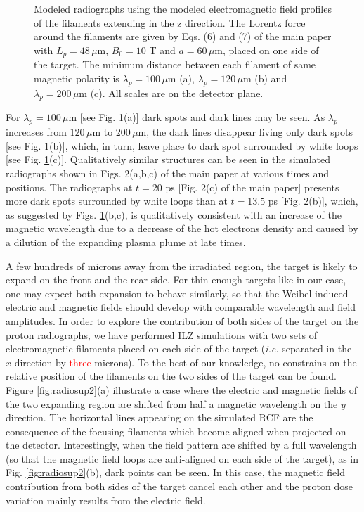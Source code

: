 \documentclass[aps,showpacs,superscriptaddress]{revtex4}
\begin{document}
\begin{figure}[ht]
{\begin{tabular}{ccc}
\end{tabular}}
\caption{\label{fig:radiosup}  
Modeled radiographs using the modeled electromagnetic field profiles of the filaments extending in the z direction.
The Lorentz force around the  filaments  are given by Eqs. (6) and (7) of the main paper with $L_p = 48 \, \mu$m, $B_0= 10$ T and $a = 60\, \mu$m, placed on one side of the target.
The minimum distance between each filament of same magnetic polarity is $ \lambda_p =100\, \mu$m  (a), $ \lambda_p =120\, \mu$m  (b) and $ \lambda_p =200\, \mu$m   (c).
All scales are on the detector plane.
}
\end{figure}
For  $ \lambda_p =100\, \mu$m [see Fig. \ref{fig:radiosup}(a)]  dark spots and dark lines  may be seen. As  $ \lambda_p$ increases from $120\, \mu$m  to   $ 200\, \mu$m, the dark lines disappear living only dark spots [see Fig. \ref{fig:radiosup}(b)], which, in turn, leave place to dark spot surrounded by white loops [see Fig. \ref{fig:radiosup}(c)]. Qualitatively similar structures can be seen in the simulated radiographs shown in Figs. 2(a,b,c) of the main paper at various times and positions. 
The radiographs at $t =20$ ps  [Fig. 2(c) of the main paper] presents more dark spots surrounded by white loops than at $t= 13.5$ ps  [Fig. 2(b)],  which, as suggested by Figs. \ref{fig:radiosup}(b,c), is qualitatively consistent with an increase of the magnetic wavelength due to a decrease of the hot electrons density and caused by a dilution of the expanding plasma plume at late times.

A few hundreds of microns away from the irradiated region, the target is likely to expand on the front and the rear side. 
For thin enough targets like in our case, one may expect both expansion to behave similarly, so that the  Weibel-induced electric and magnetic fields should develop with comparable wavelength and field amplitudes. 
In order to explore the contribution of both  sides of the target on the proton radiographs, we have performed ILZ simulations with two  sets of electromagnetic filaments placed on each side of the target (\emph{i.e.} separated in the $x$ direction by \textcolor{red}{three} microns).
To the best of our knowledge, no constrains on the relative position of the filaments on the two sides of the target can be found. 
Figure \ref{fig:radiosup2}(a) illustrate a case where the electric and magnetic fields of the two expanding region are shifted from half a magnetic wavelength on the $y$ direction. The horizontal lines appearing on the simulated RCF are the consequence of the focusing filaments which become aligned when projected on the detector.
Interestingly, when the field pattern are shifted by a full wavelength (so that the magnetic field loops are anti-aligned on each side of the target), as in Fig. \ref{fig:radiosup2}(b), dark points can be seen. In this case, the magnetic field contribution from both sides of the target cancel each other and the proton dose variation mainly results from the electric field. 
\end{document}
